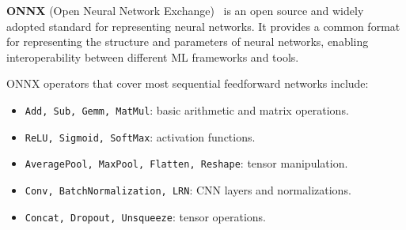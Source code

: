\documentclass[oneside,11pt,dvipsnames]{book}
\numberwithin{equation}{section}
\theoremstyle{definition}
\theoremstyle{remark}
\begin{document}
\textbf{ONNX} (Open Neural Network Exchange)~\cite{onnx} is an open source and widely adopted standard for representing neural networks. It provides a common format for representing the structure and parameters of neural networks, enabling interoperability between different ML frameworks and tools.



ONNX operators that cover most sequential feedforward networks include: 
\begin{itemize}
    \item \texttt{Add, Sub, Gemm, MatMul}: basic arithmetic and matrix operations.
    \item \texttt{ReLU, Sigmoid, SoftMax}: activation functions.
    \item \texttt{AveragePool, MaxPool, Flatten, Reshape}: tensor manipulation.
    \item \texttt{Conv, BatchNormalization, LRN}: CNN layers and normalizations.
    \item \texttt{Concat, Dropout, Unsqueeze}: tensor operations.
\end{itemize}

\end{document}
